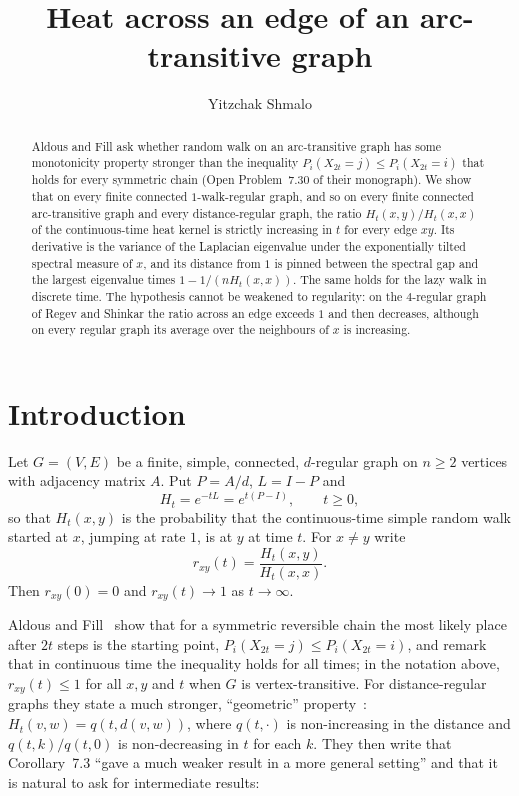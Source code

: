 \documentclass[11pt]{amsart}
\title[Heat across an edge]{Heat across an edge of an arc-transitive graph}
\author{Yitzchak Shmalo}
\theoremstyle{definition}
\theoremstyle{remark}
\begin{document}
\begin{abstract}
Aldous and Fill ask whether random walk on an arc-transitive graph has some monotonicity property stronger than the inequality $P_i(X_{2t}=j)\le P_i(X_{2t}=i)$ that holds for every symmetric chain (Open Problem~7.30 of their monograph). We show that on every finite connected $1$-walk-regular graph, and so on every finite connected arc-transitive graph and every distance-regular graph, the ratio $H_t(x,y)/H_t(x,x)$ of the continuous-time heat kernel is strictly increasing in $t$ for every edge $xy$. Its derivative is the variance of the Laplacian eigenvalue under the exponentially tilted spectral measure of $x$, and its distance from $1$ is pinned between the spectral gap and the largest eigenvalue times $1-1/(nH_t(x,x))$. The same holds for the lazy walk in discrete time. The hypothesis cannot be weakened to regularity: on the $4$-regular graph of Regev and Shinkar the ratio across an edge exceeds $1$ and then decreases, although on every regular graph its average over the neighbours of $x$ is increasing.
\end{abstract}

\maketitle

\section{Introduction}

Let $G=(V,E)$ be a finite, simple, connected, $d$-regular graph on $n\ge2$ vertices with adjacency matrix $A$. Put $P=A/d$, $L=I-P$ and
\[
H_t=e^{-tL}=e^{t(P-I)},\qquad t\ge0,
\]
so that $H_t(x,y)$ is the probability that the continuous-time simple random walk started at $x$, jumping at rate $1$, is at $y$ at time $t$. For $x\ne y$ write
\[
r_{xy}(t)=\frac{H_t(x,y)}{H_t(x,x)} .
\]
Then $r_{xy}(0)=0$ and $r_{xy}(t)\to1$ as $t\to\infty$.

Aldous and Fill~\cite[Section~7.1.3, Corollary~7.3, p.~241]{AF} show that for a symmetric reversible chain the most likely place after $2t$ steps is the starting point, $P_i(X_{2t}=j)\le P_i(X_{2t}=i)$, and remark that in continuous time the inequality holds for all times; in the notation above, $r_{xy}(t)\le1$ for all $x,y$ and $t$ when $G$ is vertex-transitive. For distance-regular graphs they state a much stronger, ``geometric'' property~\cite[Proposition~7.29, p.~262]{AF}: $H_t(v,w)=q(t,d(v,w))$, where $q(t,\cdot)$ is non-increasing in the distance and $q(t,k)/q(t,0)$ is non-decreasing in $t$ for each $k$. They then write that Corollary~7.3 ``gave a much weaker result in a more general setting'' and that it is natural to ask for intermediate results:
\end{document}
